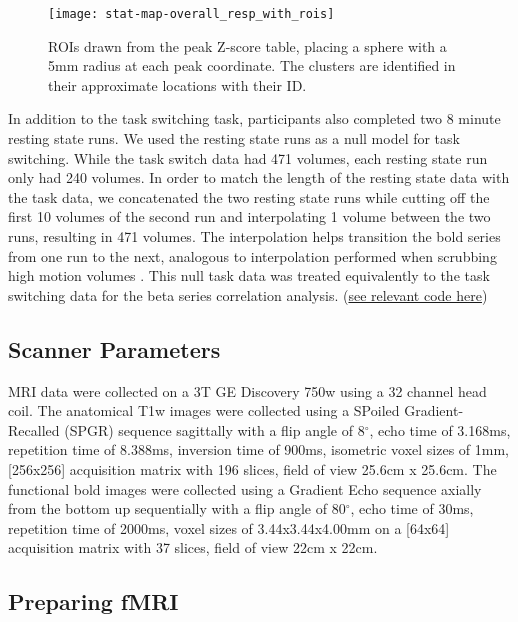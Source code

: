 \documentclass[10pt,letterpaper]{article}
\begin{document}
\begin{figure}[H]
  \centering
  \texttt{[image: stat-map-overall\_resp\_with\_rois]}
  \caption{
    ROIs drawn from the peak Z-score table, placing a sphere with a 5mm radius
    at each peak coordinate.
    The clusters are identified in their approximate locations
    with their ID.
  }
  \label{fig:methroimap}
\end{figure}

In addition to the task switching task, participants also completed
two 8 minute resting state runs.
We used the resting state runs as a null model for task switching.
While the task switch data had 471 volumes, each resting state run only had
240 volumes.
In order to match the length of the resting state data with the task data, we concatenated
the two resting state runs while cutting off the first 10 volumes of the second run
and interpolating 1 volume between the two runs, resulting in 471 volumes.
The interpolation helps transition the bold series from one run to the next,
analogous to interpolation performed when scrubbing high motion volumes \cite{Power2014a}. 
This null task data was treated equivalently to the task switching data for the
beta series correlation analysis.
(\href{https://github.com/jdkent/validateBetaSeries/tree/195ad5b4201971038dbbf8f73a3c537caf032743}{see relevant code here})

\subsection*{Scanner Parameters}
\label{methods:scanner}

MRI data were collected on a 3T GE Discovery 750w using a 32 channel head coil.
The anatomical T1w images were collected using a SPoiled Gradient-Recalled (SPGR) sequence
sagittally with a flip angle of 8$^{\circ}$, echo time of 3.168ms,
repetition time of 8.388ms, inversion time of 900ms, isometric voxel sizes of 1mm,
[256x256] acquisition matrix with 196 slices, field of view 25.6cm x 25.6cm.
The functional bold images were collected using a Gradient Echo sequence axially from
the bottom up sequentially with a flip angle of 80$^{\circ}$, echo time of 30ms,
repetition time of 2000ms, voxel sizes of 3.44x3.44x4.00mm on a [64x64] acquisition matrix
with 37 slices, field of view 22cm x 22cm.

\subsection*{Preparing fMRI}
\label{methods:fmriprep}
\end{document}
